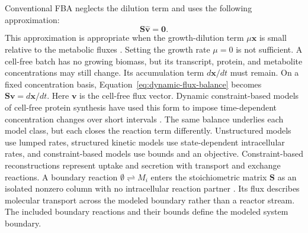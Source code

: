 Conventional FBA neglects the dilution term and uses the following
approximation:
\begin{equation}\label{eq:sv0}
  \mathbf S\hat{\mathbf v}=\mathbf 0.
\end{equation}
This approximation is appropriate when the growth-dilution term
$\mu\mathbf x$ is small relative to the metabolic fluxes \cite{Orth2010}.
Setting the growth rate $\mu=0$ is not sufficient. A
cell-free batch has no growing biomass, but its transcript, protein, and
metabolite concentrations may still change. Its accumulation term
$d\mathbf x/dt$ must remain. On a fixed concentration basis,
Equation~\eqref{eq:dynamic-flux-balance} becomes
$\mathbf S\mathbf v=d\mathbf x/dt$. Here $\mathbf v$ is the cell-free flux
vector. Dynamic constraint-based models of cell-free protein synthesis have
used this form to impose time-dependent
concentration changes over short intervals \cite{Dai2018}. The same balance
underlies each model class, but each closes the reaction term differently.
Unstructured models use lumped rates, structured kinetic models use state-dependent
intracellular rates, and constraint-based models use bounds and an
objective. Constraint-based reconstructions represent uptake and secretion
with transport and exchange reactions. A boundary reaction
$\emptyset\rightleftharpoons M_i$ enters the stoichiometric matrix $\mathbf S$
as an isolated nonzero column with no intracellular reaction partner
\cite{Bordbar2014}.
Its flux describes molecular transport across the modeled boundary rather
than a reactor stream. The included boundary reactions and their bounds
define the modeled system boundary.
